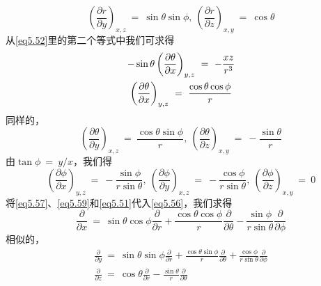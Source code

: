 \documentclass[12pt,a4paper,openany]{ctexbook}
\newcommand{\paren}[1]{\left( #1 \right)}
\begin{document}
\begin{flushleft}
\begin{center}
\begin{minipage}{0.8\textwidth}
\begin{equation}
        \paren{\frac{\partial r}{\partial y}}_{x,z}\ =\ \sin\theta\sin\phi,\ \paren{\frac{\partial r}{\partial z}}_{x,y}\ =\ \cos\theta \label{eq5.58}
    \end{equation}
    从\eqref{eq5.52}里的第二个等式中我们可求得
    \begin{gather}
        -\sin\theta\paren{\frac{\partial\theta}{\partial x}}_{y,z}\ =\ -\frac{xz}{r^3} \notag \\
        \paren{\frac{\partial\theta}{\partial x}}_{y,z}\ =\ \frac{\cos\theta\cos\phi}{r} \label{eq5.59}
    \end{gather}
    同样的，
    \begin{equation}
        \paren{\frac{\partial\theta}{\partial y}}_{x,z}\ =\ \frac{\cos\theta\sin\phi}{r},\ \paren{\frac{\partial\theta}{\partial z}}_{x,y}\ =\ -\frac{\sin\theta}{r} \label{eq5.60}
    \end{equation}
    由$\tan\phi\ =\ y/x$，我们得
    \begin{equation}
        \paren{\frac{\partial\phi}{\partial x}}_{y,z}\ =\ -\frac{\sin\phi}{r\sin\theta},\ \paren{\frac{\partial\phi}{\partial y}}_{x,z}\ =\ -\frac{\cos\phi}{r\sin\theta},\ \paren{\frac{\partial\phi}{\partial z}}_{x,y}\ =\ 0 \label{eq5.61}
    \end{equation}
    将\eqref{eq5.57}、\eqref{eq5.59}和\eqref{eq5.51}代入\eqref{eq5.56}，我们求得
    \begin{equation}
        \frac{\partial}{\partial x}\ =\ \sin\theta\cos\phi\frac{\partial}{\partial r}+\frac{\cos\theta\cos\phi}{r}\frac{\partial}{\partial \theta}-\frac{\sin\phi}{r\sin\theta}\frac{\partial}{\partial \phi} \label{eq5.62}
    \end{equation}
    相似的，
    \begin{gather}
        \frac{\partial}{\partial y}\ =\ \sin\theta\sin\phi\frac{\partial}{\partial r}+\frac{\cos\theta\sin\phi}{r}\frac{\partial}{\partial \theta}+\frac{\cos\phi}{r\sin\theta}\frac{\partial}{\partial \phi} \label{eq5.63} \\
        \frac{\partial}{\partial z}\ =\ \cos\theta\frac{\partial}{\partial r}-\frac{\sin\theta}{r}\frac{\partial}{\partial\theta} \label{eq5.64}
    \end{gather}
    \end{minipage}
\end{center}


\end{flushleft}
\end{document}
